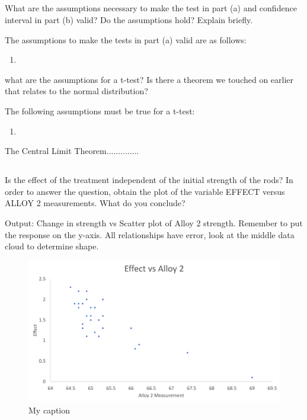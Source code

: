 \documentclass[letterpaper]{article}
\begin{document}
\subsection{}%
What are the  assumptions necessary to make the test in part (a) and confidence
interval in part (b)  valid?  Do the assumptions hold?  Explain briefly.

The assumptions to make the tests in part (a) valid are as follows:

\begin{enumerate}
 \item
\end{enumerate}

what are the assumptions for a t-test? Is there a theorem we touched on earlier
that relates to the normal distribution?

The following assumptions must be true for a t-test:
\begin{enumerate}
 \item
\end{enumerate}
The Central Limit Theorem..............

\subsection{}%
Is the effect of the treatment independent of the initial strength of the rods?
In order to answer the  question, obtain the plot of the variable EFFECT versus
ALLOY 2 measurements. What do you  conclude?

Output: Change in strength vs Scatter plot of Alloy 2 strength.
Remember to put the response on the y-axis. All relationships have
error, look at the middle data cloud to determine shape.

\begin{figure}[H]
 \centering
 \includegraphics[width=\textwidth]{q6.png}
 \caption{My caption}
 \label{q6}
\end{figure}
\end{document}

